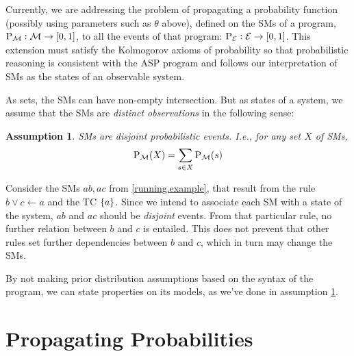 \documentclass{tlp}
\newtheorem{assumption}{Assumption}
\newcommand{\at}[1]{\ensuremath{\!\del{#1}}}        %
\newcommand{\cla}[1]{\ensuremath{{\cal #1}}}        %
\newcommand{\clause}{\ensuremath{\leftarrow}}
\newcommand{\MODELset}{\ensuremath{\cla{M}}}
\newcommand{\EVENTSset}{\ensuremath{\cla{E}}}
\newcommand{\prfunc}{\ensuremath{\mathrm{P}}}
\newcommand{\prd}[1]{\ensuremath{\prfunc_{#1}}}
\newcommand{\prM}{\prd{\MODELset}}
\newcommand{\prE}{\prd{\EVENTSset}}
\newcommand{\franc}[1]{{\color{green!30!black}#1}}
\begin{document}
Currently, we are addressing the problem of propagating a probability
function (possibly using parameters such as \(\theta\) above), defined
on the \aclp{SM} of a program,
\franc{\(\prM: \MODELset \to \intcc{0,1}\)}, to all the events of that
program: \franc{\(\prE: \EVENTSset \to \intcc{0,1}\)}.  This extension
must satisfy the Kolmogorov axioms of probability so that
probabilistic reasoning is consistent with the \ac{ASP} program and
follows our interpretation of \aclp{SM} as the states of an observable
system.

As sets, the \aclp{SM} can have non-empty intersection.  But as states
of a system, we assume that the \aclp{SM} are \emph{distinct
  observations} in the following sense:

\begin{assumption}\label{assumption:smodels.disjoint}%
  \Aclp{SM} are disjoint probabilistic events. \textit{I.e.,} for any
  set \(X\) of \aclp{SM},
  \begin{equation}
        \prM\at{X} = \sum_{s\in X}\prM\at{s}
  \end{equation}
\end{assumption}

Consider the \aclp{SM} \(ab, ac\) from \cref{running.example}, that
result from the rule \(b \vee c \clause a\) and the \acl{TC}
\(\set{a}\).  Since we intend to associate each \acl{SM} with a state
of the system, \(ab\) and \(ac\) should be \emph{disjoint} events.
From that particular rule, no further relation between \(b\) and \(c\)
is entailed.  This does not prevent that other rules set further
dependencies between \(b\) and \(c\), which in turn may change the
\aclp{SM}.

By not making prior distribution assumptions based on the syntax of
the program, we can state properties on its models, as we've done in
assumption \ref{assumption:smodels.disjoint}.


\section{Propagating Probabilities}
\label{sec:propagating.probalilities}
\end{document}
